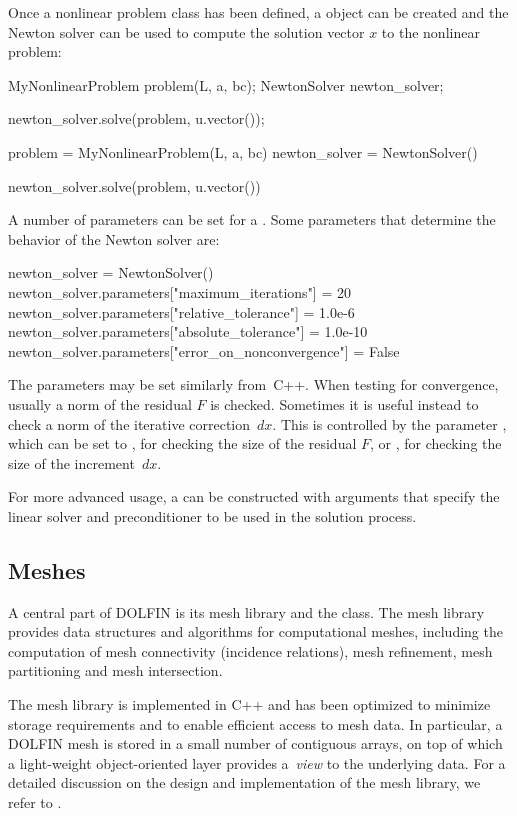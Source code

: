 Once a nonlinear problem class has been defined, a 
object can be created and the Newton solver can be used to compute
the solution vector $x$ to the nonlinear problem:
\begin{c++}
MyNonlinearProblem problem(L, a, bc);
NewtonSolver newton_solver;

newton_solver.solve(problem, u.vector());
\end{c++}
\begin{python}
problem = MyNonlinearProblem(L, a, bc)
newton_solver = NewtonSolver()

newton_solver.solve(problem, u.vector())
\end{python}
A number of parameters can be set for a . Some
parameters that determine the behavior of the Newton solver are:
\begin{python}
newton_solver = NewtonSolver()
newton_solver.parameters["maximum_iterations"] = 20
newton_solver.parameters["relative_tolerance"] = 1.0e-6
newton_solver.parameters["absolute_tolerance"] = 1.0e-10
newton_solver.parameters["error_on_nonconvergence"] = False
\end{python}
The parameters may be set similarly from~C++.  When testing for
convergence, usually a norm of the residual $F$ is checked.  Sometimes it
is useful instead to check a norm of the iterative correction~$dx$.
This is controlled by the parameter , which
can be set to , for checking the size of the residual $F$,
or , for checking the size of the increment~$dx$.

For more advanced usage, a  can be constructed with
arguments that specify the linear solver and preconditioner to be used
in the solution process.

\subsection{Meshes}

A central part of DOLFIN is its mesh library and the 
class. The mesh library provides data structures and algorithms for
computational meshes, including the computation of mesh connectivity
(incidence relations), mesh refinement, mesh partitioning and mesh
intersection.

The mesh library is implemented in C++ and has been optimized to
minimize storage requirements and to enable efficient access to mesh
data. In particular, a DOLFIN mesh is stored in a small number of
contiguous arrays, on top of which a light-weight object-oriented
layer provides a~\emph{view} to the underlying data. For a detailed
discussion on the design and implementation of the mesh library, we
refer to \citet{Logg2009}.

